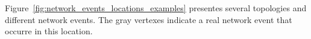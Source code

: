 Figure~\ref{fig:network_events_locations_examples} presentes several topologies
and different network events. The gray vertexes indicate a real network event
that occurre in this location.

\begin{figure}[H]
    \centering
\end{figure}

